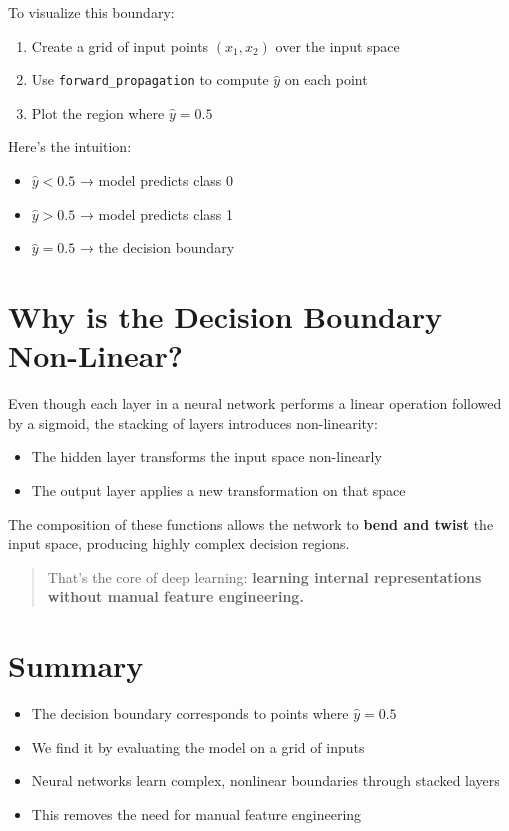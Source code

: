 \documentclass[11pt]{article}
\begin{document}
To visualize this boundary:

\begin{enumerate}
    \item Create a grid of input points $(x_1, x_2)$ over the input space
    \item Use \texttt{forward\_propagation} to compute $\hat{y}$ on each point
    \item Plot the region where $\hat{y} = 0.5$
\end{enumerate}

\noindent Here's the intuition:
\begin{itemize}
    \item $\hat{y} < 0.5$ → model predicts class 0
    \item $\hat{y} > 0.5$ → model predicts class 1
    \item $\hat{y} = 0.5$ → the decision boundary
\end{itemize}

\section*{Why is the Decision Boundary Non-Linear?}

Even though each layer in a neural network performs a linear operation followed by a sigmoid,  
the stacking of layers introduces non-linearity:

\begin{itemize}
    \item The hidden layer transforms the input space non-linearly
    \item The output layer applies a new transformation on that space
\end{itemize}

The composition of these functions allows the network to \textbf{bend and twist} the input space,  
producing highly complex decision regions.

\begin{quote}
That’s the core of deep learning:  
\textbf{learning internal representations without manual feature engineering.}
\end{quote}

\section*{Summary}

\begin{itemize}
    \item The decision boundary corresponds to points where $\hat{y} = 0.5$
    \item We find it by evaluating the model on a grid of inputs
    \item Neural networks learn complex, nonlinear boundaries through stacked layers
    \item This removes the need for manual feature engineering
\end{itemize}
\end{document}
